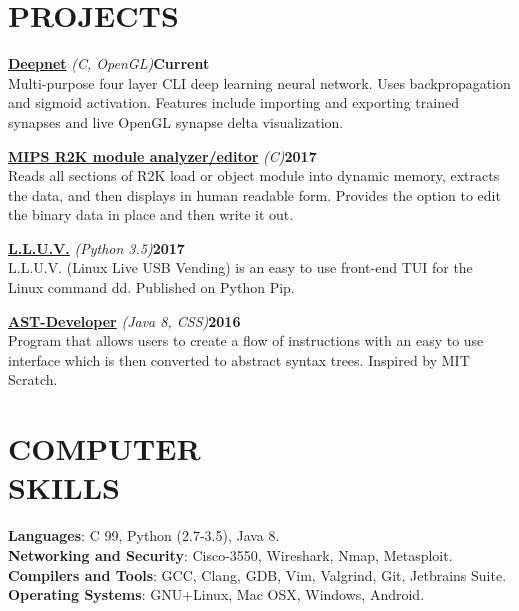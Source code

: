 \documentclass[line,margin]{res}
\begin{document}
\begin{resume}
\section{PROJECTS}
\par
    \href{https://github.com/jmp1617/deepnet.git}{\textbf{Deepnet}}
    {\sl (C, OpenGL)}\hfill \textbf{Current}\\ 
    Multi-purpose four layer CLI deep learning neural network. Uses
    backpropagation and sigmoid activation. Features include importing and 
    exporting trained synapses and live OpenGL synapse delta visualization.
\par
    \href{https://github.com/jmp1617/lmedit.git}
    {\textbf{MIPS R2K module analyzer/editor}}
    {\sl (C)}\hfill \textbf{2017}\\
    Reads all sections of R2K load or object module into dynamic memory, 
    extracts the data, and then displays in human readable form. Provides the 
    option to edit the binary data in place and then write it out.
\par
    \href{https://github.com/jmp1617/LLUV.git}{\textbf{L.L.U.V.}}
    {\sl (Python 3.5)}\hfill \textbf{2017}\\ 
    L.L.U.V. (Linux Live USB Vending) is an easy to use front-end TUI for the 
    Linux command dd. Published on Python Pip.
\par
    \href{https://github.com/jmp1617/ast-developer.git}{\textbf{AST-Developer}}
    {\sl (Java 8, CSS)}\hfill \textbf{2016}\\ 
    Program that allows users to create a flow of instructions with an easy to
    use interface which is then converted to abstract syntax trees. Inspired by 
    MIT Scratch.

\section{COMPUTER\\SKILLS}
\textbf{Languages}: C 99, Python (2.7-3.5), Java 8.
\\
\textbf{Networking and Security}: Cisco-3550, Wireshark, Nmap, Metasploit.  
\\
\textbf{Compilers and Tools}: GCC, Clang, GDB, Vim, Valgrind, Git, 
Jetbrains Suite. 
\\
\textbf{Operating Systems}: 
GNU+Linux, Mac OSX, Windows, Android.


\end{resume}
\end{document}
